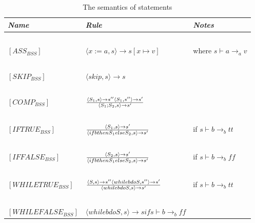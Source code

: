 \begin{table}[h]
	\begin{tabular}{|l|l|l|}
	\hline
	\emph{Name}			& \emph{Rule}																															& \emph{Notes} \\ \hline
			~			&															~																			& ~ \\
	$[ASS_{BSS}]$		& $\langle x := a,s \rangle \rightarrow s[x \mapsto v]$																					& where $s \vdash a \rightarrow_{a} v$ \\
			~			&															~																			& ~ \\
	$[SKIP_{BSS}]$		& $\langle skip, s \rangle \rightarrow s$																								& ~ \\
			~			&															~																			& ~ \\
	$[COMP_{BSS}]$		& $\langle S_{1},s \rangle \rightarrow s''  \langle S_{1},s'' \rangle \rightarrow s'  \over \langle S_{1};S_{2},s \rangle \rightarrow s'$	& ~ \\
			~			&															~																			& ~ \\
	$[IFTRUE_{BSS}]$	& $\langle S_{1},s \rangle \rightarrow s' \over \langle if b then S_{1} else S_{2},s \rangle \rightarrow s'	$							& if $s \vdash b \rightarrow_{b} tt$\\
			~			&															~																			& ~ \\
	$[IFFALSE_{BSS}]$	& $\langle S_{2},s \rangle \rightarrow s' \over \langle if b then S_{1} else S_{2},s \rangle \rightarrow s'	$							& if $s \vdash b \rightarrow_{b} ff$\\
			~			&															~																			& ~ \\
	$[WHILETRUE_{BSS}]$	& $\langle S,s \rangle \rightarrow s'' \langle while b do S,s'' \rangle \rightarrow s' \over \langle while b do S,s \rangle \rightarrow s'	$ & if $s \vdash b \rightarrow_{b} tt$\\
			~			&															~																			& ~ \\
	$[WHILEFALSE_{BSS}]$& $\langle while b do S,s \rangle \rightarrow s if s \vdash b \rightarrow_{b} ff $														& ~ \\
	\hline
	\end{tabular}
	\label{tab:semantics_statements}
	\caption{The semantics of statements}
\end{table}